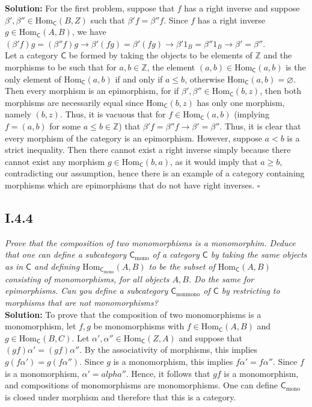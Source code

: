 \documentclass[11pt,a4paper]{article}
\newcommand{\morph}[3]{\text{Hom}_{#1}(#2,#3)}
\begin{document}
\noindent \textbf{Solution: } For the first problem, suppose that $f$ has a right inverse and suppose $\beta', \beta'' \in \morph{\textsf{C}}{B}{Z}$ such that $\beta' f = \beta'' f$. Since $f$ has a right inverse $g \in \morph{\textsf{C}}{A}{B}$, we have $(\beta' f) g = (\beta'' f)g \rightarrow \beta'(fg) = \beta'(fg) \rightarrow \beta' 1_B = \beta'' 1_B \rightarrow \beta' = \beta''$.
\\

\noindent Let a category $\textsf{C}$ be formed by taking the objects to be elements of $\mathbb{Z}$ and the morphisms to be such that for $a,b\in \mathbb{Z}$, the element $(a,b) \in \morph{\textsf{C}}{a}{b}$ is the only element of $\morph{\textsf{C}}{a}{b}$ if and only if $a \leq b$, otherwise $\morph{\textsf{C}}{a}{b} = \varnothing$.  Then every morphism is an epimorphism, for if $\beta', \beta'' \in \morph{\textsf{C}}{b}{z}$, then both morphisms are necessarily equal since $\morph{\textsf{C}}{b}{z}$ has only one morphism, namely $(b,z)$.  Thus, it is vacuous that for $f \in \morph{\textsf{C}}{a}{b}$ (implying $f = (a,b)$ for some $a \leq b \in \mathbb{Z}$) that $\beta'f = \beta''f \rightarrow \beta' = \beta''$.  Thus, it is clear that every morphism of the category is an epimorphism.  However, suppose $a < b$ is a strict inequality.  Then there cannot exist a right inverse simply because there cannot exist any morphism $g \in \morph{\textsf{C}}{b}{a}$, as it would imply that $a \geq b$, contradicting our assumption, hence there is an example of a category containing morphisms which are epimorphisms that do not have right inverses. $\square$

\subsection*{I.4.4}\textit{Prove that the composition of two monomorphisms is a monomorphim.  Deduce that one can define a subcategory $\textsf{C}_{\text{mono}}$ of a category $\textsf{C}$ by taking the same objects as in $\textsf{C}$ and defining $\morph{\textsf{C}_{\text{mono}}}{A}{B}$ to be the subset of $\morph{\textsf{C}}{A}{B}$ consisting of monomorphisms, for all objects $A,B$.  Do the same for epimorphisms. Can you define a subcategory $\textsf{C}_{\text{nonmono}}$ of $\textsf{C}$ by restricting to morphisms that are not monomorphisms?}\\

\noindent\textbf{Solution: } To prove that the composition of two monomorphisms is a monomorphism, let $f, g$ be monomorphisms with $f \in \morph{\textsf{C}}{A}{B}$ and $g \in \morph{\textsf{C}}{B}{C}$.  Let $\alpha',\alpha'' \in \morph{\textsf{C}}{Z}{A}$ and suppose that $(gf)\alpha' = (gf)\alpha''$.  By the associativity of morphisms, this implies $g(f \alpha') =  g(f \alpha'')$.  Since $g$ is a monomorphism, this implies $f\alpha' = f\alpha''$.  Since $f$ is a monomorphism, $\alpha' = alpha''$.  Hence, it follows that $gf$ is a monomorphism, and compositions of monomorphisms are monomorphisms. One can define $\textsf{C}_{\text{mono}}$ is closed under morphism and therefore that this is a category.\\
\end{document}

